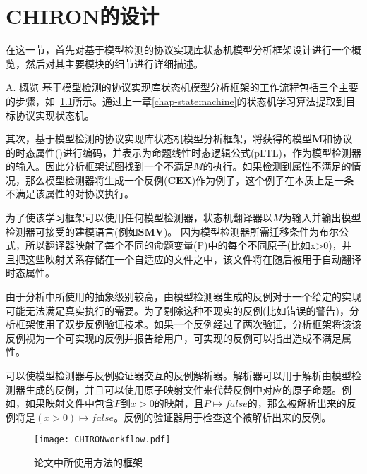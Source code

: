 \chapter{CHIRON的设计}
\label{chap:CHIRON}

在这一节，首先对基于模型检测的协议实现库状态机模型分析框架设计进行一个概览，然后对其主要模块的细节进行详细描述。

{\hei A. 概览}
基于模型检测的协议实现库状态机模型分析框架的工作流程包括三个主要的步骤，如~\ref{fig:CHIRONworkflow}所示。通过上一章\ref{chap-statemachine}的状态机学习算法提取到目标协议实现状态机。

其次，基于模型检测的协议实现库状态机模型分析框架，将获得的模型$\mathbf{M}$和协议的时态属性(\varphi)进行编码，并表示为命题线性时态逻辑公式(pLTL)，作为模型检测器的输入。因此分析框架试图找到一个不满足$M$的执行。如果检测到属性不满足的情况，那么模型检测器将生成一个反例($\mathbf{CEX}$)作为例子，这个例子在本质上是一条不满足该属性的对协议执行。

为了使该学习框架可以使用任何模型检测器，状态机翻译器以$M$为输入并输出模型检测器可接受的建模语言(例如$\mathbf{SMV}$)。
因为模型检测器所需迁移条件为布尔公式，所以翻译器映射了每个不同的命题变量(P)中的每个不同原子(比如x>0)，并且把这些映射关系存储在一个自适应的文件之中，该文件将在随后被用于自动翻译时态属性\varphi。%

由于分析中所使用的抽象级别较高，由模型检测器生成的反例对于一个给定的实现可能无法满足真实执行的需要。为了剔除这种不现实的反例(比如错误的警告)，分析框架使用了双步反例验证技术。如果一个反例经过了两次验证，分析框架将该该反例视为一个可实现的反例并报告给用户，可实现的反例可以指出造成不满足属性。

可以使模型检测器与反例验证器交互的反例解析器。解析器可以用于解析由模型检测器生成的反例，并且可以使用原子映射文件来代替反例中对应的原子命题。例如，如果映射文件中包含$P$到${x > 0}$的映射，且$P\mapsto false$的，那么被解析出来的反例将是$(x > 0) \mapsto false$。反例的验证器用于检查这个被解析出来的反例。

\begin{figure}[htb]
  \centering%
  \texttt{[image: CHIRONworkflow.pdf]}
  \caption{论文中所使用方法的框架}
  \label{fig:CHIRONworkflow}
\end{figure}


